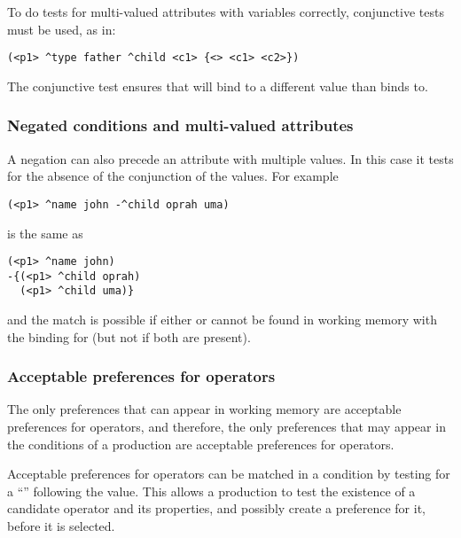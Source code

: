 To do tests for multi-valued attributes with variables correctly,
conjunctive tests must be used, as in:

\begin{verbatim}
(<p1> ^type father ^child <c1> {<> <c1> <c2>})
\end{verbatim} \vspace{12pt}

The conjunctive test  ensures that  will
bind to a different value than  binds to.


\subsubsection*{Negated conditions and multi-valued attributes}

A negation can also precede an attribute with multiple values.  In this case
it tests for the absence of the conjunction of the values.  For example

\begin{verbatim}
(<p1> ^name john -^child oprah uma)
\end{verbatim}

is the same as 

\begin{verbatim}
(<p1> ^name john)
-{(<p1> ^child oprah)
  (<p1> ^child uma)}
\end{verbatim}

and the match is possible if either  or
 cannot be found in working memory with the
binding for  (but not if both are present).

\subsubsection{Acceptable preferences for operators}
\label{SYNTAX-pm-acceptable}
\index{+}

The only preferences that can appear in working memory are acceptable
preferences for operators, and therefore, the only preferences that may appear
in the conditions of a production are acceptable preferences for operators.

Acceptable preferences for operators can be matched in a condition by testing
for a ``\soar{+}'' following the value.  This allows a production to test the
existence of a candidate operator and its properties, and possibly create a
preference for it, before it is selected.

